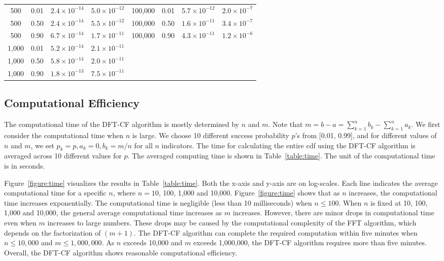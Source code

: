\documentclass[12pt]{article}
\begin{document}
\begin{table}
\begin{tabular}{cccc|cccc}
500  &0.01  &$2.4\times10^{-14}$&$5.0\times10^{-12}$&100{,}000&0.01   &$5.7\times10^{-12}$&$2.0\times10^{-7}$\\
500  &0.50  &$2.4\times10^{-14}$&$5.5\times10^{-12}$&100{,}000&0.50   &$1.6\times10^{-11}$&$3.4\times10^{-7}$\\
500  &0.90  &$6.7\times10^{-14}$&$1.7\times10^{-11}$&100{,}000&0.90   &$4.3\times10^{-11}$&$1.2\times10^{-6}$\\
1{,}000 &0.01  &$5.2\times10^{-14}$&$2.1\times10^{-11}$\\
1{,}000 &0.50  &$5.8\times10^{-14}$&$2.0\times10^{-11}$\\
1{,}000 &0.90  &$1.8\times10^{-13}$&$7.5\times10^{-11}$\\\hline\hline
\end{tabular}
\end{table}



\subsection{Computational Efficiency}
The computational time of the DFT-CF algorithm is mostly determined by $n$ and $m$. Note that $m=b-a=\sum_{k=1}^n b_k-\sum_{k=1}^n a_k$. We first consider the computational time when $n$ is large. We choose 10 different success probability $p$'s from [0.01, 0.99], and for different values of $n$ and $m$, we set $p_k=p, a_k=0, b_k=m/n$ for all $n$ indicators. The time for calculating the entire cdf using the DFT-CF algorithm is averaged across 10 different values for $p$. The averaged computing time is shown in Table~\ref{table:time}. The unit of the computational time is in seconds.

Figure~\ref{figure:time} visualizes the results in Table~\ref{table:time}. Both the x-axis and y-axis are on log-scales. Each line indicates the average computational time for a specific $n$, where $n=10$, 100, 1{,}000 and 10,000. Figure~\ref{figure:time} shows that as $n$ increases, the computational time increases exponentially. The computational time is negligible (less than 10 milliseconds) when $n \leq 100$. When $n$ is fixed at 10, 100, 1{,}000 and 10{,}000, the general average computational time increases as $m$ increases. However, there are minor drops in computational time even when $m$ increases to large numbers. These drops may be caused by the computational complexity of the FFT algorithm, which depends on the factorization of $(m+1)$. The DFT-CF algorithm can complete the required computation within five minutes when $n \leq 10{,}000$ and $m \leq 1{,}000{,}000$. As $n$ exceeds 10{,}000 and $m$ exceeds 1{,}000{,}000, the DFT-CF algorithm requires more than five minutes. Overall, the DFT-CF algorithm shows reasonable computational efficiency.
\end{document}
